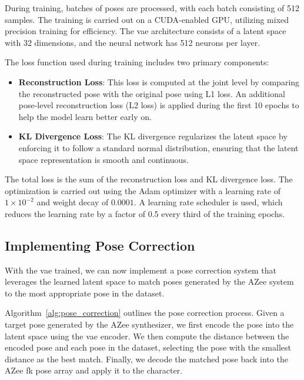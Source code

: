 \documentclass[../../main.tex]{subfiles}
\begin{document}
During training, batches of poses are processed, with each batch consisting of 512 samples. The training is carried out on a CUDA-enabled GPU, utilizing mixed precision training for efficiency. The \gls{vae} architecture consists of a latent space with 32 dimensions, and the neural network has 512 neurons per layer. 

The loss function used during training includes two primary components: 
\begin{itemize}
    \item \textbf{Reconstruction Loss}: This loss is computed at the joint level by comparing the reconstructed pose with the original pose using L1 loss. An additional pose-level reconstruction loss (L2 loss) is applied during the first 10 epochs to help the model learn better early on.
    \item \textbf{KL Divergence Loss}: The KL divergence regularizes the latent space by enforcing it to follow a standard normal distribution, ensuring that the latent space representation is smooth and continuous.
\end{itemize}

The total loss is the sum of the reconstruction loss and KL divergence loss. The optimization is carried out using the Adam optimizer with a learning rate of $1 \times 10^{-2}$ and weight decay of $0.0001$. A learning rate scheduler is used, which reduces the learning rate by a factor of 0.5 every third of the training epochs. 

\subsection{Implementing Pose Correction}
\label{ch:intermediate_blocks_pose_correction:pose_correction_with_azee:implementation}

With the \gls{vae} trained, we can now implement a pose correction system that leverages the learned latent space to match poses generated by the AZee system to the most appropriate pose in the dataset.

Algorithm~\ref{alg:pose_correction} outlines the pose correction process. Given a target pose generated by the AZee synthesizer, we first encode the pose into the latent space using the \gls{vae} encoder. We then compute the distance between the encoded pose and each pose in the dataset, selecting the pose with the smallest distance as the best match. Finally, we decode the matched pose back into the AZee \gls{fk} pose array and apply it to the character.
\end{document}
